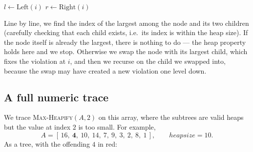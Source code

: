 \begin{algorithm}[H]
\caption{\textsc{Max-Heapify}$(A, i)$ --- sink the value at $i$ into place}
$l \leftarrow \mathrm{Left}(i)$\;
$r \leftarrow \mathrm{Right}(i)$\;
\end{algorithm}

Line by line, we find the index of the largest among the node and its two
children (carefully checking that each child exists, i.e.\ its index is
within the heap size). If the node itself is already the largest, there is
nothing to do --- the heap property holds here and we stop. Otherwise we swap the
node with its largest child, which fixes the violation at $i$, and then we
recurse on the child we swapped into, because the swap may have created a new
violation one level down.


\subsection{A full numeric trace}

We trace \textsc{Max-Heapify}$(A, 2)$ on this array, where the subtrees are
valid heaps but the value at index $2$ is too small. For example,
\[
  A = [\,16,\ \mathbf{4},\ 10,\ 14,\ 7,\ 9,\ 3,\ 2,\ 8,\ 1\,],
  \qquad \mathit{heapsize} = 10.
\]
As a tree, with the offending $4$ in red:

\begin{center}
\end{center}

